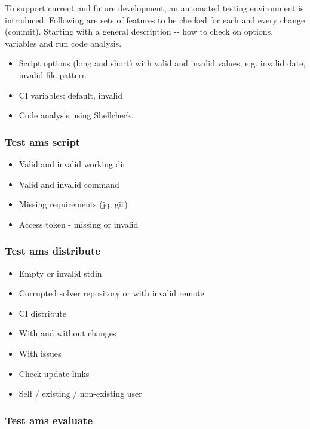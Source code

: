 {To support current and future development, an automated testing environment is introduced. Following are sets of features to be checked for each and every change (commit). Starting with a general description -\/- how to check on options, variables and run code analysis.}

\begin{itemize}
\item
  {Script options (long and short) with valid and invalid values, e.g. invalid date, invalid file pattern}
\item
  {CI variables: default, invalid}
\item
  {Code analysis using Shellcheck.}
\end{itemize}

\subsubsection{Test ams script}

\begin{itemize}
\item
  {Valid and invalid working dir}
\item
  {Valid and invalid command}
\item
  {Missing requirements (jq, git)}
\item
  {Access token - missing or invalid}
\end{itemize}

\subsubsection{Test ams distribute}

\begin{itemize}
\item
  {Empty or invalid stdin}
\item
  {Corrupted solver repository or with invalid remote}
\item
  {CI distribute}
\end{itemize}

\begin{itemize}
\item
  {With and without changes}
\item
  {With issues}
\item
  {Check update links}
\item
  {Self / existing / non-existing user}
\end{itemize}

\subsubsection{Test ams evaluate}

